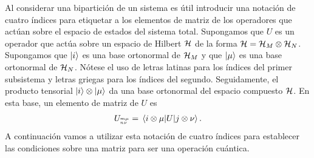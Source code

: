 Al considerar una bipartición de un sistema es útil introducir una notación
de cuatro índices para etiquetar a los elementos de matriz de los operadores
que actúan sobre el espacio de estados del sistema total. 
Supongamos que $U$ es un operador que actúa sobre un espacio de Hilbert 
$\mathcal{H}$ de la forma $\mathcal{H}=\mathcal{H}_M\otimes\mathcal{H}_N$.
Supongamos que $\ket{i}$ es una base ortonormal de $\mathcal{H}_M$ 
y que $\ket{\mu}$ es una base ortonormal de $\mathcal{H}_N$. 
Nótese el uso de letras latinas para los índices del
primer subsistema y letras griegas para los índices del segundo.
Seguidamente, el producto tensorial $\ket{i}\otimes\ket{\mu}$
da una base ortonormal del espacio compuesto $\mathcal{H}$. 
En esta base, un elemento de matriz de $U$ es
\begin{align}
U_\ind{m\mu}{n\nu}=\matrixel{i\otimes \mu}{U}{j\otimes \nu}.
\label{eq:4indices}
\end{align}
A continuación vamos a utilizar esta notación de cuatro índices
para establecer las condiciones sobre una matriz para ser una 
operación cuántica. 
 

